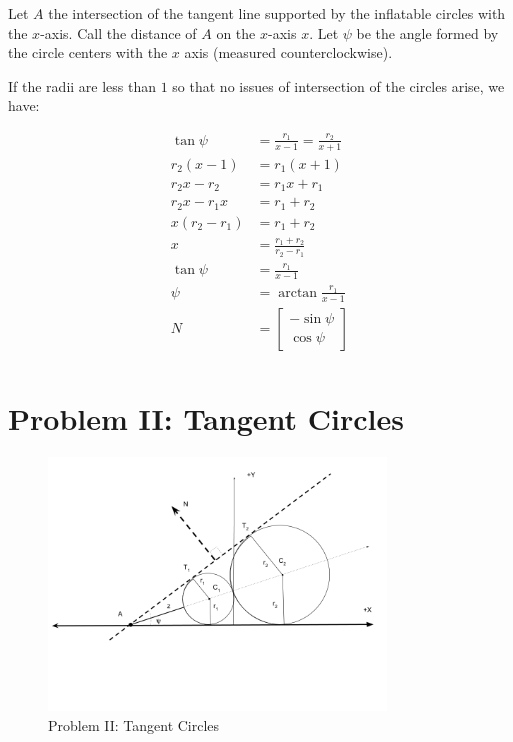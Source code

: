 \documentclass{article}
\begin{document}
Let $A$ the intersection of the tangent line supported
by the inflatable circles with the $x$-axis. Call the distance of $A$
on the $x$-axis $x$. Let $\psi$ be the angle formed by the
circle centers with the $x$ axis (measured counterclockwise).

If the radii are less than $1$ so that no issues of intersection
of the circles arise, we have:

\begin{align}
  \tan{\psi} &= \frac{r_1}{x-1} = \frac{r_2}{x+1}  \\
  r_2(x - 1) &= r_1(x+1) \\
  r_2x - r_2 &= r_1x + r_1 \\
  r_2x - r_1x &= r_1 + r_2 \\
  x(r_2 - r_1) &= r_1 + r_2 \\
  x &= \frac{r_1+r_2}{r_2 - r_1} \\
  \tan{\psi} &= \frac{r_1}{x - 1} \\
  \psi &= \arctan{\frac{r_1}{x - 1}} \\
  N &=  \begin{bmatrix} -\sin{\psi} \\ \cos{\psi}  \end{bmatrix} \\
\end{align}





\section{Problem II: Tangent Circles}


\begin{figure}
     \centering
     \includegraphics[width=0.80\textwidth]{figures/TangentCircles.png}
     \caption{Problem II: Tangent Circles}
  \label{fig:Tangent}
\end{figure}
\end{document}
